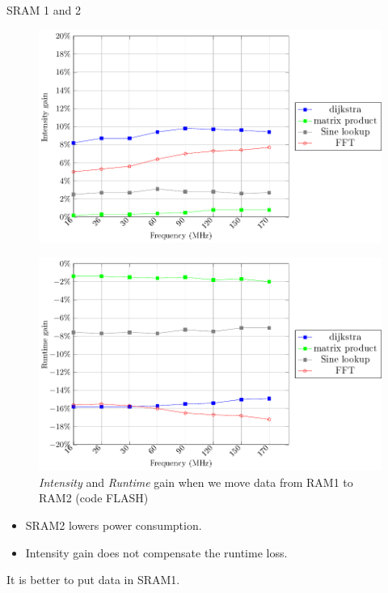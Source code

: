 \documentclass[
	11pt, %
]{beamer}
\begin{document}
\begin{frame}{SRAM 1 and 2}
	\begin{minipage}{0.5\textwidth}
		\begin{figure}
			\includegraphics[scale = 0.35]{data/stm32g_v2/data_ram_data_ram2/intensity.pdf}
		\end{figure}
		\vspace*{-0.5cm}
		\begin{figure}
			\includegraphics[scale = 0.35]{data/stm32g_v2/data_ram_data_ram2/duration.pdf}
			\caption{\emph{Intensity} and \emph{Runtime} gain when we move data from RAM1 to RAM2 (code FLASH)}
		\end{figure}
	\end{minipage}
	\begin{minipage}{0.4\textwidth}
		\begin{itemize}
			\item SRAM2 lowers power consumption. 
			\item Intensity gain does not compensate the runtime loss. 
		\end{itemize}
		It is better to put data in SRAM1.
	\end{minipage}
\end{frame}
\end{document}
